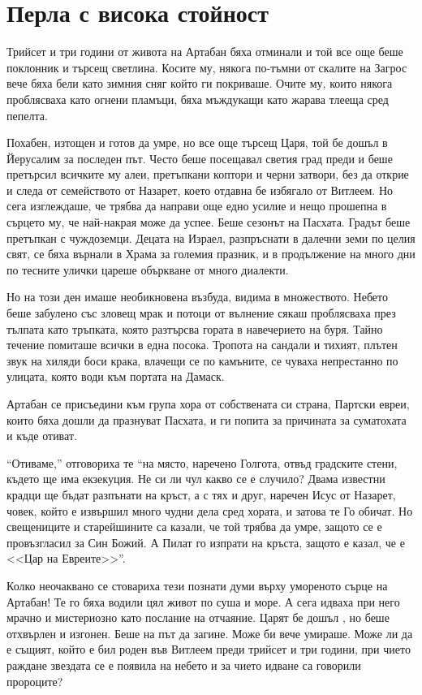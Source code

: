 \documentclass[oneside,10pt]{memoir}
\begin{document}
\part{Перла с висока стойност}

Трийсет и три години от живота на Артабан бяха отминали и той все още беше
поклонник и търсещ светлина. Косите му, някога по-тъмни от скалите на Загрос
вече бяха бели като зимния сняг който ги покриваше. Очите му, които някога
проблясваха като огнени пламъци, бяха мъждукащи като жарава тлееща сред пепелта.

Похабен, изтощен и готов да умре, но все още търсещ Царя, той бе дошъл в
Йерусалим за последен път. Често беше посещавал светия град преди и беше
претърсил всичките му алеи, претъпкани коптори и черни затвори, без да открие и
следа от семейството от Назарет, което отдавна бе избягало от Витлеем. Но сега
изглеждаше, че трябва да направи още едно усилие и нещо прошепна в сърцето му,
че най-накрая може да успее. Беше сезонът на Пасхата. Градът беше претъпкан с
чуждоземци. Децата на Израел, разпръснати в далечни земи по целия свят, се бяха
върнали в Храма за големия празник, и в продължение на много дни по тесните
улички цареше объркване от много диалекти.

Но на този ден имаше необикновена възбуда, видима в множеството. Небето беше
забулено със зловещ мрак и потоци от вълнение сякаш проблясваха през тълпата
като тръпката, която разтърсва гората в навечерието на буря. Тайно течение
помиташе всички в една посока. Тропота на сандали и тихият, плътен звук на
хиляди боси крака, влачещи се по камъните, се чуваха непрестанно по улицата,
която води към портата на Дамаск.

Артабан се присъедини към група хора от собствената си страна, Партски евреи,
които бяха дошли да празнуват Пасхата, и ги попита за причината за суматохата
и къде отиват.

``Отиваме,'' отговориха те ``на място, наречено Голгота, отвъд градските стени,
където ще има екзекуция. Не си ли чул какво се е случило? Двама известни крадци
ще бъдат разпънати на кръст, а с тях и друг, наречен Исус от Назарет, човек,
който е извършил много чудни дела сред хората, и затова те Го обичат. Но
свещениците и старейшините са казали, че той трябва да умре, защото се е
провъзгласил за Син Божий. А Пилат го изпрати на кръста, защото е казал, че е
<<Цар на Евреите>>''.

Колко неочаквано се стовариха тези познати думи върху умореното сърце на
Артабан! Те го бяха водили цял живот по суша и море. А сега идваха при него
мрачно и мистериозно като послание на отчаяние. Царят бе дошъл , но беше
отхвърлен и изгонен. Беше на път да загине. Може би вече умираше. Може ли да е
същият, който е бил роден във Витлеем преди трийсет и три години, при чието
раждане звездата се е появила на небето и за чието идване са говорили пророците?
\end{document}
